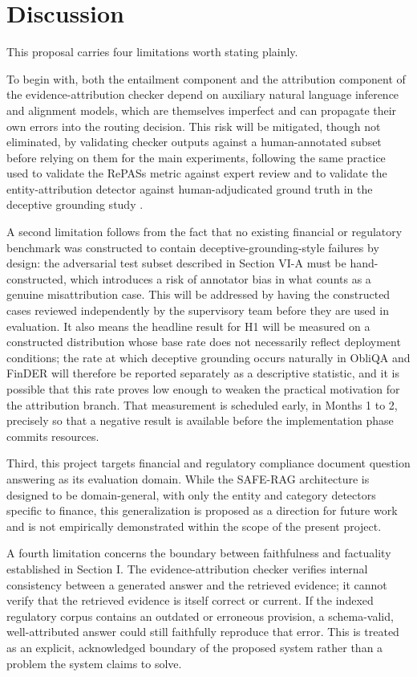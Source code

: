 \documentclass[10pt,twocolumn,letterpaper]{article}
\begin{document}
\section{Discussion}

This proposal carries four limitations worth stating plainly.

To begin with, both the entailment component and the attribution component of the evidence-attribution checker depend on auxiliary natural language inference and alignment models, which are themselves imperfect and can propagate their own errors into the routing decision. This risk will be mitigated, though not eliminated, by validating checker outputs against a human-annotated subset before relying on them for the main experiments, following the same practice used to validate the RePASs metric against expert review \cite{rirag} and to validate the entity-attribution detector against human-adjudicated ground truth in the deceptive grounding study \cite{deceptive}.

A second limitation follows from the fact that no existing financial or regulatory benchmark was constructed to contain deceptive-grounding-style failures by design: the adversarial test subset described in Section VI-A must be hand-constructed, which introduces a risk of annotator bias in what counts as a genuine misattribution case. This will be addressed by having the constructed cases reviewed independently by the supervisory team before they are used in evaluation. It also means the headline result for H1 will be measured on a constructed distribution whose base rate does not necessarily reflect deployment conditions; the rate at which deceptive grounding occurs naturally in ObliQA and FinDER will therefore be reported separately as a descriptive statistic, and it is possible that this rate proves low enough to weaken the practical motivation for the attribution branch. That measurement is scheduled early, in Months 1 to 2, precisely so that a negative result is available before the implementation phase commits resources.

Third, this project targets financial and regulatory compliance document question answering as its evaluation domain. While the SAFE-RAG architecture is designed to be domain-general, with only the entity and category detectors specific to finance, this generalization is proposed as a direction for future work and is not empirically demonstrated within the scope of the present project.

A fourth limitation concerns the boundary between faithfulness and factuality established in Section I. The evidence-attribution checker verifies internal consistency between a generated answer and the retrieved evidence; it cannot verify that the retrieved evidence is itself correct or current. If the indexed regulatory corpus contains an outdated or erroneous provision, a schema-valid, well-attributed answer could still faithfully reproduce that error. This is treated as an explicit, acknowledged boundary of the proposed system rather than a problem the system claims to solve.
\end{document}
